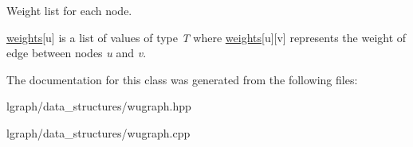 Weight list for each node. 

\hyperlink{classlgraph_1_1wxgraph_a6f8c983edc82913c2d78b7bc871defe8}{weights}\mbox{[}u\mbox{]} is a list of values of type {\itshape T} where \hyperlink{classlgraph_1_1wxgraph_a6f8c983edc82913c2d78b7bc871defe8}{weights}\mbox{[}u\mbox{]}\mbox{[}v\mbox{]} represents the weight of edge between nodes {\itshape u} and {\itshape v}. 

The documentation for this class was generated from the following files\+:\begin{DoxyCompactItemize}
\item 
lgraph/data\+\_\+structures/wugraph.\+hpp\item 
lgraph/data\+\_\+structures/wugraph.\+cpp\end{DoxyCompactItemize}
